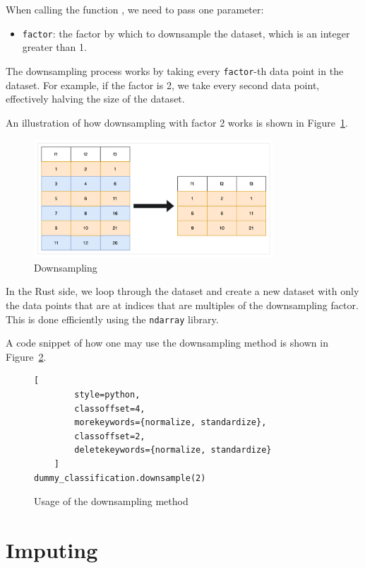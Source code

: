 \documentclass[review]{AIM_report}
\begin{document}
When calling the function \downsample, we need to pass one parameter:
\begin{itemize}
    \item \verb|factor|: the factor by which to downsample the dataset, which is an integer greater than 1.
\end{itemize}

The downsampling process works by taking every \verb|factor|-th data point in the dataset. For example, if the factor is 2, we take every second data point, effectively halving the size of the dataset.

An illustration of how downsampling with factor 2 works is shown in Figure~\ref{fig:downsampling}.
\begin{figure}
    \centering
    \includegraphics[width=0.8\textwidth]{files/downsampling/downsampling.png}
    \caption{Downsampling}
    \label{fig:downsampling}
\end{figure}

In the Rust side, we loop through the dataset and create a new dataset with only the data points that are at indices that are multiples of the downsampling factor. This is done efficiently using the \texttt{ndarray} library.

A code snippet of how one may use the downsampling method is shown in Figure~\ref{fig:usage_downsampling}.
\begin{figure}[H]
    \begin{lstlisting}[
        style=python, 
        classoffset=4, 
        morekeywords={normalize, standardize}, 
        classoffset=2, 
        deletekeywords={normalize, standardize}
    ]
dummy_classification.downsample(2)
    \end{lstlisting}
    \caption{Usage of the downsampling method}
    \label{fig:usage_downsampling}
\end{figure}

\newpage
\section{Imputing}
\end{document}
